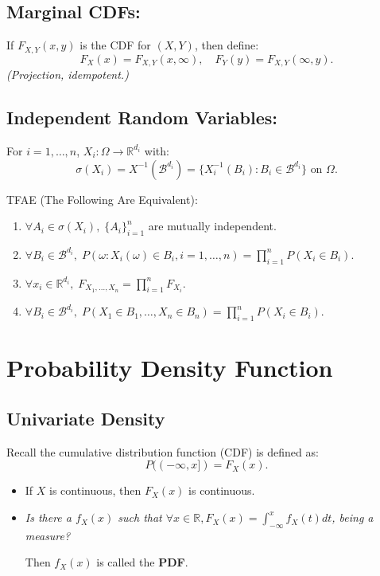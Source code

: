 \subsection{Marginal CDFs:}
If \( F_{X,Y}(x,y) \) is the CDF for \( (X, Y) \), then define:
\[
F_X(x) = F_{X,Y}(x, \infty), \quad F_Y(y) = F_{X,Y}(\infty, y).
\]
\textit{(Projection, idempotent.)}

\subsection*{Independent Random Variables:}
For \( i = 1, \dots, n \), \( X_i: \Omega \to \mathbb{R}^{d_i} \) with:
\[
\sigma(X_i) = X^{-1}(\mathscr{B}^{d_i}) = \{ X_i^{-1}(B_i): B_i \in \mathscr{B}^{d_i} \} \text{ on } \Omega.
\]

\begin{thm}{TFAE (The Following Are Equivalent):}
\begin{enumerate}
    \item \( \forall A_i \in \sigma(X_i), \; \{A_i\}_{i=1}^n \) are mutually independent.
    \item \( \forall B_i \in \mathscr{B}^{d_i}, \; P\left( \omega: X_i(\omega) \in B_i, i = 1, \dots, n \right) = \prod_{i=1}^n P(X_i \in B_i) \).
    \item \( \forall x_i \in \mathbb{R}^{d_i}, \; F_{X_1, \dots, X_n} = \prod_{i=1}^n F_{X_i}. \)
    \item \( \forall B_i \in \mathscr{B}^{d_i}, \; P(X_1 \in B_1, \dots, X_n \in B_n) = \prod_{i=1}^n P(X_i \in B_i). \)
\end{enumerate}
\end{thm}

\newpage
\section{Probability Density Function}
\subsection{Univariate Density}
Recall the cumulative distribution function (CDF) is defined as:
\[
P((-\infty, x]) = F_X(x).
\]
\begin{itemize}
    \item If \( X \) is continuous, then \( F_X(x) \) is continuous.
    \item \textit{Is there a \( f_X(x) \) such that \(\forall x \in \mathbb{R}, F_X(x) = \int_{-\infty}^x f_X(t) dt\), being a measure?} 
    
    Then \( f_X(x) \) is called the \textbf{PDF}.
\end{itemize}

